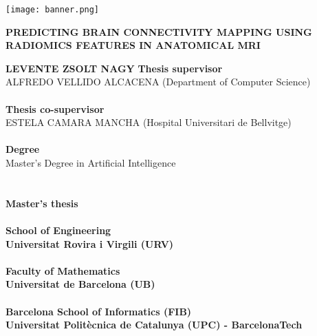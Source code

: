 \begin{titlepage}
    \begin{center}
        \begingroup
          \let\clearpage\relax

          \texttt{[image: banner.png]}
          \vfill
          \LARGE
          \begin{center}
          \textbf{\MakeUppercase{Predicting Brain Connectivity Mapping Using Radiomics Features in Anatomical MRI}}
          \end{center}
          \vfill
          \large
          \textbf{\MakeUppercase{Levente Zsolt Nagy}}
          \vfill
          \normalsize
          \textbf{Thesis supervisor}\\
          \MakeUppercase{Alfredo Vellido Alcacena} (Department of Computer Science)\\
          \hfill\\
          \textbf{Thesis co-supervisor}\\
          \MakeUppercase{Estela Camara Mancha} (Hospital Universitari de Bellvitge)\\
          \hfill\\
          \textbf{Degree}\\
          Master's Degree in Artificial Intelligence\\
          \hfill\\\hfill\\
          \textbf{Master's thesis}\\
          \hfill\\
          \textbf{School of Engineering}\\
          \textbf{Universitat Rovira i Virgili (URV)}\\
          \hfill\\
          \textbf{Faculty of Mathematics}\\
          \textbf{Universitat de Barcelona (UB)}\\
          \hfill\\
          \textbf{Barcelona School of Informatics (FIB)}\\
          \textbf{Universitat Politècnica de Catalunya (UPC) - BarcelonaTech}\\



\end{center}
\end{titlepage}
